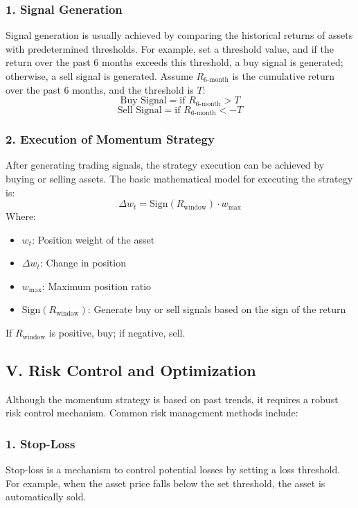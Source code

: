 \documentclass[12pt, oneside]{article}
\numberwithin{equation}{section}
\begin{document}
\subsubsection*{1. Signal Generation}

Signal generation is usually achieved by comparing the historical returns of assets with predetermined thresholds. For example, set a threshold value, and if the return over the past 6 months exceeds this threshold, a buy signal is generated; otherwise, a sell signal is generated.
Assume \( R_{\text{6-month}} \) is the cumulative return over the past 6 months, and the threshold is \( T \):
\[
\text{Buy Signal} = \text{if } R_{\text{6-month}} > T
\]
\[
\text{Sell Signal} = \text{if } R_{\text{6-month}} < -T
\]

\subsubsection*{2. Execution of Momentum Strategy}

After generating trading signals, the strategy execution can be achieved by buying or selling assets. The basic mathematical model for executing the strategy is:
\[
\Delta w_t = \text{Sign}(R_{\text{window}}) \cdot w_{\text{max}}
\]
Where:
\begin{itemize}
    \item \( w_t \): Position weight of the asset
    \item \( \Delta w_t \): Change in position
    \item \( w_{\text{max}} \): Maximum position ratio
    \item \( \text{Sign}(R_{\text{window}}) \): Generate buy or sell signals based on the sign of the return
\end{itemize}
If \( R_{\text{window}} \) is positive, buy; if negative, sell.

\subsection*{V. Risk Control and Optimization}

Although the momentum strategy is based on past trends, it requires a robust risk control mechanism. Common risk management methods include:

\subsubsection*{1. Stop-Loss}

Stop-loss is a mechanism to control potential losses by setting a loss threshold. For example, when the asset price falls below the set threshold, the asset is automatically sold.
\end{document}
